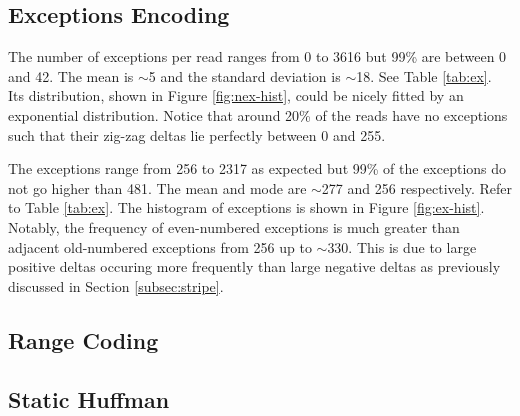 \subsection{Exceptions Encoding}

The number of exceptions per read ranges from 0 to 3616 but 99\% are between 0 and 42. The mean is $\sim$5 and the standard deviation is $\sim$18. See Table \ref{tab:ex}. Its distribution, shown in Figure \ref{fig:nex-hist}, could be nicely fitted by an exponential distribution. Notice that around 20\% of the reads have no exceptions such that their zig-zag deltas lie perfectly between 0 and 255.




The exceptions range from 256 to 2317 as expected but 99\% of the exceptions do not go higher than 481. The mean and mode are $\sim$277 and 256 respectively. Refer to Table \ref{tab:ex}. The histogram of exceptions is shown in Figure \ref{fig:ex-hist}. Notably, the frequency of even-numbered exceptions is much greater than adjacent old-numbered exceptions from 256 up to $\sim$330. This is due to large positive deltas occuring more frequently than large negative deltas as previously discussed in Section \ref{subsec:stripe}.



\subsection{Range Coding}

\subsection{Static Huffman}

